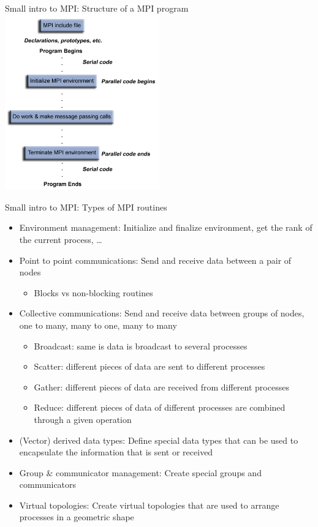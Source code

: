 \documentclass[10pt,xcolor=table]{beamer}
\begin{document}
\begin{frame}{Small intro to MPI: Structure of a MPI program}
\centering
\includegraphics[width=0.5\textwidth]{figs/prog_structure.png}
\end{frame}

\begin{frame}{Small intro to MPI: Types of MPI routines}
\begin{itemize}
\footnotesize
    \item Environment management: Initialize and finalize environment, get the rank of the current process, \ldots
    \item Point to point communications: Send and receive data between a pair of nodes
        \begin{itemize}
            \item Blocks vs non-blocking routines
        \end{itemize}
    \item Collective communications: Send and receive data between groups of nodes, one to many, many to one, many to many
        \begin{itemize}
            \item Broadcast: same is data is broadcast to several processes
            \item Scatter: different pieces of data are sent to different processes
            \item Gather: different pieces of data are received from different processes
            \item Reduce: different pieces of data of different processes are combined through a given operation
        \end{itemize}
    \item (Vector) derived data types: Define special data types that can be used to encapsulate the information that is sent or received 
    \item Group \& communicator management: Create special groups and communicators
    \item Virtual topologies: Create virtual topologies that are used to arrange processes in a geometric shape
\end{itemize}
    
\end{frame}
\end{document}

